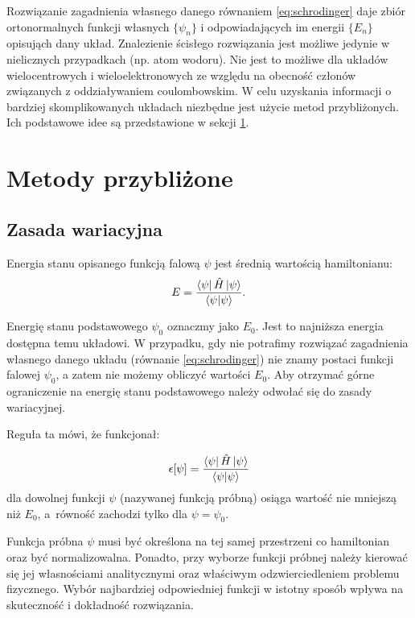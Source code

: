 \documentclass[a4paper,12pt]{article}
\numberwithin{equation}{section}
\numberwithin{table}{section}
\numberwithin{figure}{section}
\begin{document}
Rozwiązanie zagadnienia własnego danego równaniem \eqref{eq:schrodinger} daje zbiór ortonormalnych funkcji własnych $\{\psi_n\}$ i odpowiadających im energii $\{E_n\}$ opisująch dany układ. Znalezienie ścisłego rozwiązania jest możliwe jedynie w nielicznych przypadkach (np. atom wodoru). Nie jest to możliwe dla układów wielocentrowych i wieloelektronowych ze względu na obecność członów związanych z oddziaływaniem coulombowskim. W celu uzyskania informacji o bardziej skomplikowanych układach niezbędne jest użycie metod przybliżonych. Ich podstawowe idee są przedstawione w sekcji \ref{sec:metody}.

%
%
\section{Metody przybliżone} \label{sec:metody}

\subsection{Zasada wariacyjna} \label{sec:wariacyjna}

Energia stanu opisanego funkcją falową $\psi$ jest średnią wartością hamiltonianu:
\begin{equation} \label{eq:energia}
E = \frac{\bra{\psi}\hat{H}\ket{\psi}}{\braket{\psi|\psi}}.
\end{equation}

Energię stanu podstawowego $\psi_0$ oznaczmy jako $E_0$. Jest to najniższa energia dostępna temu układowi. W przypadku, gdy nie potrafimy rozwiązać zagadnienia własnego danego układu (równanie \eqref{eq:schrodinger}) nie znamy postaci funkcji falowej $\psi_0$, a zatem nie możemy obliczyć wartości $E_0$. Aby otrzymać górne ograniczenie na energię stanu podstawowego należy odwołać się do zasady wariacyjnej.

Reguła ta mówi, że funkcjonał:

\begin{equation} \label{eq:wariacyjna}
\epsilon[\psi] = \frac{\bra{\psi}\hat{H}\ket{\psi}}{\braket{\psi|\psi}}
\end{equation}
dla dowolnej funkcji $\psi$ (nazywanej funkcją próbną) osiąga wartość nie mniejszą niż $E_0$, \mbox{a równość} zachodzi tylko dla $\psi = \psi_0$.

Funkcja próbna $\psi$ musi być określona na tej samej przestrzeni co hamiltonian oraz być normalizowalna. Ponadto, przy wyborze funkcji próbnej należy kierować się jej własnościami analitycznymi oraz właściwym odzwierciedleniem problemu fizycznego. Wybór najbardziej odpowiedniej funkcji w istotny sposób wpływa na skuteczność i dokładność rozwiązania.
\end{document}
